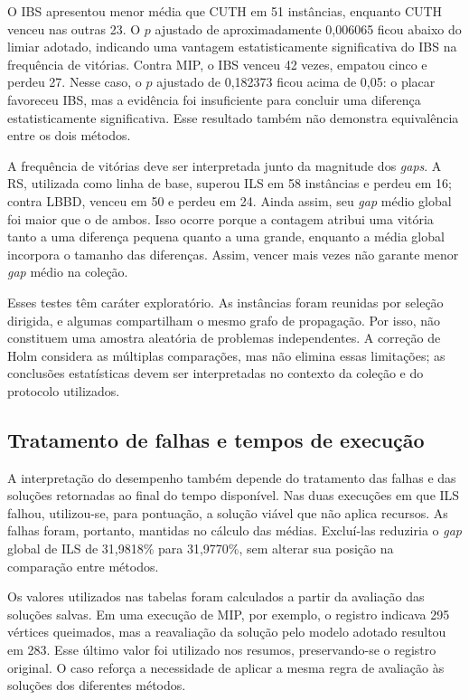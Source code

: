 O IBS apresentou menor média que CUTH em 51 instâncias, enquanto CUTH
venceu nas outras 23. O $p$ ajustado de aproximadamente 0,006065 ficou
abaixo do limiar adotado, indicando uma vantagem estatisticamente
significativa do IBS na frequência de vitórias. Contra MIP, o IBS venceu
42 vezes, empatou cinco e perdeu 27. Nesse caso, o $p$ ajustado de
0,182373 ficou acima de 0,05: o placar favoreceu IBS, mas a evidência foi
insuficiente para concluir uma diferença estatisticamente significativa.
Esse resultado também não demonstra equivalência entre os dois métodos.

A frequência de vitórias deve ser interpretada junto da magnitude dos
\textit{gaps}. A RS, utilizada como linha de base, superou ILS em 58
instâncias e perdeu em 16; contra
LBBD, venceu em 50 e perdeu em 24. Ainda assim, seu \textit{gap} médio
global foi maior que o de ambos. Isso ocorre porque a contagem atribui
uma vitória tanto a uma diferença pequena quanto a uma grande, enquanto
a média global incorpora o tamanho das diferenças. Assim, vencer mais
vezes não garante menor \textit{gap} médio na coleção.

Esses testes têm caráter exploratório. As instâncias foram reunidas por
seleção dirigida, e algumas compartilham o mesmo grafo de propagação.
Por isso, não constituem uma amostra aleatória de problemas independentes.
A correção de Holm considera as múltiplas comparações, mas não elimina
essas limitações; as conclusões estatísticas devem ser interpretadas no
contexto da coleção e do protocolo utilizados.

\subsection{Tratamento de falhas e tempos de execução}

A interpretação do desempenho também depende do tratamento das falhas e
das soluções retornadas ao final do tempo disponível. Nas duas execuções
em que ILS falhou, utilizou-se, para pontuação, a solução viável que não
aplica recursos. As falhas foram, portanto, mantidas no cálculo das médias.
Excluí-las reduziria o \textit{gap} global de ILS de 31,9818\% para
31,9770\%, sem alterar sua posição na comparação entre métodos.

Os valores utilizados nas tabelas foram calculados a partir da avaliação
das soluções salvas. Em uma execução de MIP, por exemplo, o registro
indicava 295 vértices queimados, mas a reavaliação da solução pelo modelo
adotado resultou em 283. Esse último valor foi utilizado nos resumos,
preservando-se o registro original. O caso reforça a necessidade de
aplicar a mesma regra de avaliação às soluções dos diferentes métodos.

